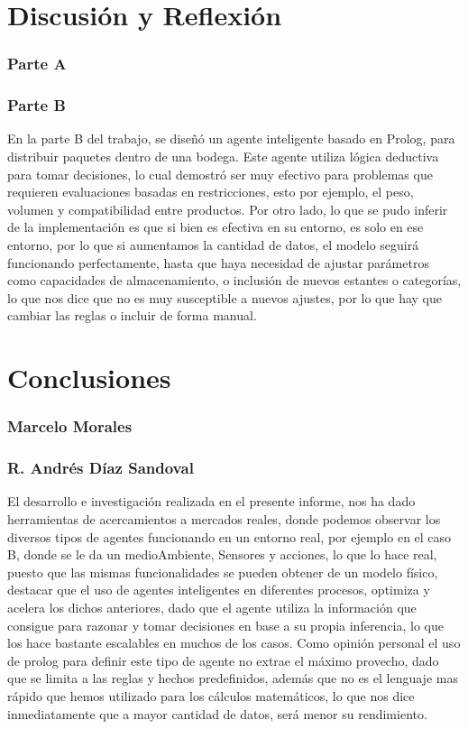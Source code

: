 \documentclass[12pt]{article}
\begin{document}
\section{Discusión y Reflexión}

\subsubsection{Parte A}

\subsubsection{Parte B}
En la parte B del trabajo, se diseñó un agente inteligente basado en Prolog, para distribuir paquetes dentro de una bodega. Este agente utiliza lógica deductiva para tomar decisiones, lo cual demostró ser muy efectivo para problemas que requieren evaluaciones basadas en restricciones, esto por ejemplo, el peso, volumen y compatibilidad entre productos. Por otro lado, lo que se pudo inferir de la implementación es que si bien es efectiva en su entorno, es solo en ese entorno, por lo que si aumentamos la cantidad de datos, el modelo seguirá funcionando perfectamente, hasta que haya necesidad de ajustar parámetros como capacidades de almacenamiento, o inclusión de nuevos estantes o categorías, lo que nos dice que no es muy susceptible a nuevos ajustes, por lo que hay que cambiar las reglas o incluir de forma manual. 

\section{Conclusiones}
\subsubsection{Marcelo Morales}

\subsubsection{R. Andrés Díaz Sandoval}
El desarrollo e investigación realizada en el presente informe, nos ha dado herramientas de acercamientos a mercados reales, donde podemos observar los diversos tipos de agentes funcionando en un entorno real, por ejemplo en el caso B, donde se le da un medioAmbiente, Sensores y acciones, lo que lo hace real, puesto que las mismas funcionalidades se pueden obtener de un modelo físico, destacar que el uso de agentes inteligentes en diferentes procesos, optimiza y acelera los dichos anteriores, dado que el agente utiliza la información que consigue para razonar y tomar decisiones en base a su propia inferencia, lo que los hace bastante escalables en muchos de los casos. Como opinión personal el uso de prolog para definir este tipo de agente no extrae el máximo provecho, dado que se limita a las reglas y hechos predefinidos, además que no es el lenguaje mas rápido que hemos utilizado para los cálculos matemáticos, lo que nos dice inmediatamente que a mayor cantidad de datos, será menor su rendimiento.
\end{document}
